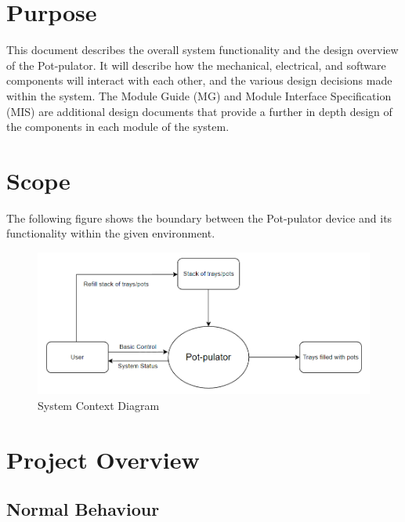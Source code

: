 \documentclass[12pt, titlepage]{article}
\begin{document}
\section{Purpose}

This document describes the overall system functionality and the design overview 
of the Pot-pulator. It will describe how the mechanical, electrical, and software 
components will interact with each other, and the various design decisions made 
within the system. The Module Guide (MG) and Module Interface Specification (MIS) 
are additional design documents that provide a further in depth design of the 
components in each module of the system.

\section{Scope}
The following figure shows the boundary between the Pot-pulator device and its functionality
within the given environment.

\begin{figure}[H]
  \includegraphics[width=\linewidth]{scope.PNG}
  \caption{System Context Diagram}
  \label{fig:scope}
\end{figure}

\section{Project Overview}

\subsection{Normal Behaviour}
\end{document}
